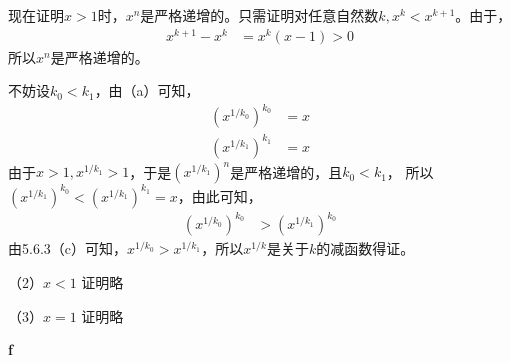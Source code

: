 \documentclass{article}
\theoremstyle{mystyle}
\begin{document}
现在证明$x>1$时，$x^n$是严格递增的。只需证明对任意自然数$k, x^k < x^{k+1}$。由于，
\begin{align*}
  x^{k+1} - x^k &= x^k(x-1) > 0
\end{align*}
所以$x^n$是严格递增的。

不妨设$k_0 < k_1$，由（a）可知，
\begin{align}
  (x^{1/k_0})^{k_0} & = x \\
  (x^{1/k_1})^{k_1} & = x
\end{align}
由于$x>1, x^{1/k_1} > 1$，于是$(x^{1/k_1})^n$是严格递增的，且$k_0<k_1$，
所以$(x^{1/k_1})^{k_0} < (x^{1/k_1})^{k_1}=x$，由此可知，
\begin{align}
  (x^{1/k_0})^{k_0} & > (x^{1/k_1})^{k_0}
\end{align}
由5.6.3（c）可知，$x^{1/k_0} > x^{1/k_1}$，所以$x^{1/k}$是关于$k$的减函数得证。

（2）$x<1$ 证明略

（3）$x=1$ 证明略

\textbf{f}
\end{document}

